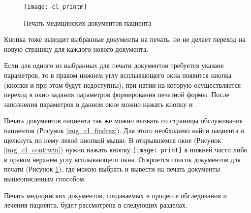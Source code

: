 {\begin{figure}[ht]\centering
 \texttt{[image: cl\_printm]}
 \caption{Печать медицинских документов пациента}
 \label{img_cl_printm}
\end{figure} 

Кнопка  тоже выводит выбранные документы на печать, но не делает переход на новую страницу для каждого нового документа.

Если для одного из выбранных для печати документов требуется указане параметров, то в правом нижнем углу всплывающего окна появится кнопка  (кнопки  и  при этом будут недоступны), при натии на которую осуществляется переход в окно задания параметров формирования печатной формы. После заполнения параметров в данном окне можно нажать кнопку  и .

Печать документов пациента так же можно вызвать со страницы обслуживания пациентов (Рисунок \ref{img_cl_findrez}). Для этого необходимо найти пациента и щелкнуть по нему левой кнопкой мыши. В открывшемся окне (Рисунок \ref{img_cl_contrwin}) нужно нажать кнопку \texttt{[image: print]} в нижней части либо в правом верхнем углу всплывающего окна. Откроется список документов для печати (Рисунок \ref{img_cl_printm}), где можно выбрать и вывести на печать документы вышеописанным способом. 
   
Печать медицинских документов, создаваемых в процессе обследования и лечения пациента, будет рассмотрена в следующих разделах.
}{}